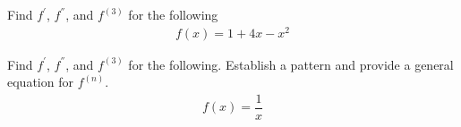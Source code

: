 \begin{exercise}
Find $f^{'}$, $f^{''}$, and $f^{(3)}$ for the following
\begin{align*}
    f(x) = 1 + 4x - x^{2}
\end{align*}
\end{exercise}

\begin{exercise}
Find $f^{'}$, $f^{''}$, and $f^{(3)}$ for the following. Establish a pattern and provide a general equation for $f^{(n)}$.
\begin{align*}
    f(x) = \dfrac{1}{x}
\end{align*}
\end{exercise}
